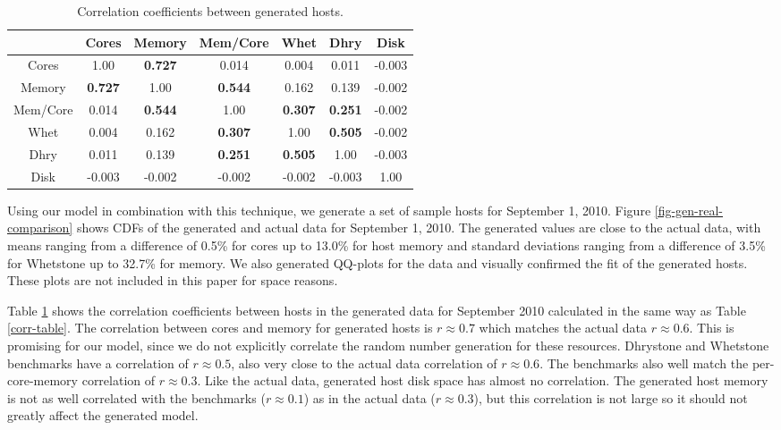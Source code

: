 \documentclass[conference]{IEEEtran}
\begin{document}
\begin{table}
\caption{Correlation coefficients between generated hosts.}
\centering
\scriptsize
\begin{tabular}{|c|c|c|c|c|c|c|}
\hline
& Cores & Memory & Mem/Core & Whet & Dhry & Disk \\
\hline
Cores & 1.00 & \cellcolor[gray]{.7} \textbf{0.727} & 0.014 & 0.004 & 0.011 & -0.003 \\
\hline
Memory & \cellcolor[gray]{.7} \textbf{0.727} & 1.00 & \cellcolor[gray]{.8} \textbf{0.544} & 0.162 & 0.139 & -0.002 \\
\hline
Mem/Core & 0.014 & \cellcolor[gray]{.8} \textbf{0.544} & 1.00 & \cellcolor[gray]{.9} \textbf{0.307} & \cellcolor[gray]{.9} \textbf{0.251} & -0.002 \\
\hline
Whet & 0.004 & 0.162 & \cellcolor[gray]{.9} \textbf{0.307} & 1.00 & \cellcolor[gray]{.8} \textbf{0.505} & -0.002 \\
\hline
Dhry & 0.011 & 0.139 & \cellcolor[gray]{.9} \textbf{0.251} & \cellcolor[gray]{.8} \textbf{0.505} & 1.00 & -0.003 \\
\hline
Disk & -0.003 & -0.002 & -0.002 & -0.002 & -0.003 & 1.00 \\
\hline
\end{tabular}
\label{gen-corr-table}
\end{table}

Using our model in combination with this technique, we
generate a set of sample hosts for September 1, 2010.
Figure \ref{fig-gen-real-comparison} shows CDFs of the
generated and actual data for September 1, 2010.  The
generated values are close to the actual data, with means
ranging from a difference of 0.5\% for cores up to 13.0\%
for host memory and standard deviations ranging from a
difference of 3.5\% for Whetstone up to 32.7\% for memory.
We also generated QQ-plots for the data and visually confirmed
the fit of the generated hosts.  These plots are not included
in this paper for space reasons.

Table \ref{gen-corr-table} shows the correlation coefficients between hosts in the generated data for September 2010 calculated in the same way as Table \ref{corr-table}.  The correlation between cores and memory for generated hosts is $r \approx 0.7$ which matches the actual data $r \approx 0.6$.  This is promising for our model, since we do not explicitly correlate the random number generation for these resources.  Dhrystone and Whetstone benchmarks have a correlation of $r \approx 0.5$, also very close to the actual data correlation of $r \approx 0.6$.  The benchmarks also well match the per-core-memory correlation of $r \approx 0.3$.  Like the actual data, generated host disk space has almost no correlation.  The generated host memory is not as well correlated with the benchmarks ($r \approx 0.1$) as in the actual data ($r \approx 0.3$), but this correlation is not large so it should not greatly affect the generated model.
\end{document}

